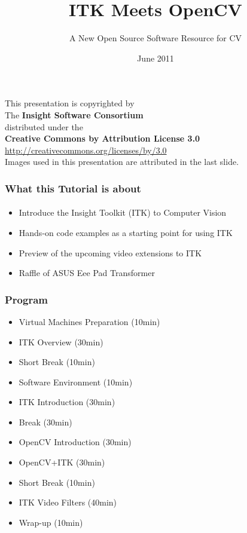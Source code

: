 \documentclass[18pt]{beamer}
\begin{document}
\title[ITK - OpenCV]{ITK Meets OpenCV}
\subtitle[ITK-OpenCV]{A New Open Source Software Resource for CV}
\date[June 2011]{June 2011}

\begin{frame}
\titlepage
\end{frame}


{
\begin{frame}[plain]
\center
\begin{center}
This presentation is copyrighted by\\
The \textbf{Insight Software Consortium}\\
\bigskip
distributed under the\\
\textbf{Creative Commons by Attribution License 3.0}\\
\url{http://creativecommons.org/licenses/by/3.0}\\
\bigskip
Images used in this presentation are attributed in the last slide.
\end{center}
\end{frame}
}


\begin{frame}
  \tableofcontents
\end{frame}


\begin{frame}
\frametitle{What this Tutorial is about}
\framesubtitle{}
\begin{itemize}
\item Introduce the Insight Toolkit (ITK) to Computer Vision
\item Hands-on code examples as a starting point for using ITK
\item Preview of the upcoming video extensions to ITK
\item Raffle of ASUS Eee Pad Transformer
\end{itemize}
\end{frame}


\begin{frame}
\frametitle{Program}
\begin{itemize}
\item Virtual Machines Preparation (10min)
\pause
\item ITK Overview (30min)
\pause
\item Short Break (10min)
\pause
\item Software Environment (10min)
\pause
\item ITK Introduction (30min)
\pause
\item Break (30min)
\pause
\item OpenCV Introduction (30min)
\pause
\item OpenCV+ITK (30min)
\pause
\item Short Break (10min)
\pause
\item ITK Video Filters (40min)
\pause
\item Wrap-up (10min)
\end{itemize}
\end{frame}















\end{document}
